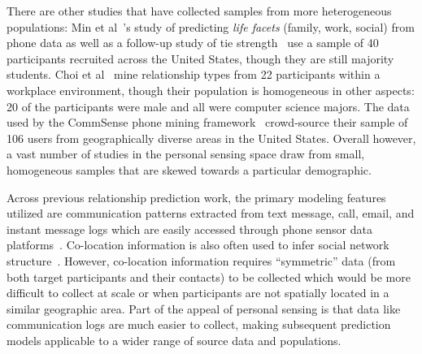 \documentclass[acmlarge]{acmart}
\begin{document}
There are other studies that have collected samples from more heterogeneous populations: Min et al~\cite{min2013mining}'s study of predicting \textit{life facets} (family, work, social) from phone data as well as a follow-up study of tie strength~\cite{wiese2015you} use a sample of 40 participants recruited across the United States, though they are still majority students. Choi et al~\cite{choi2013mining} mine relationship types from 22 participants within a workplace environment, though their population is homogeneous in other aspects: 20 of the participants were male and all were computer science majors. The data used by the CommSense phone mining framework~\cite{bao2015commsense} crowd-source their sample of 106 users from geographically diverse areas in the United States. Overall however, a vast number of studies in the personal sensing space draw from small, homogeneous samples that are skewed towards a particular demographic.

Across previous relationship prediction work, the primary modeling features utilized are communication patterns extracted from text message, call, email, and instant message logs which are easily accessed through phone sensor data platforms~\cite{mirisaee2010mining,dwarakanath2016analyzing}. Co-location information is also often used to infer social network structure~\cite{eagle2009inferring,yu2017semi,hsieh2014inferring,choi2013mining}. However, co-location information requires ``symmetric'' data (from both target participants and their contacts) to be collected which would be more difficult to collect at scale or when participants are not spatially located in a similar geographic area. Part of the appeal of personal sensing is that data like communication logs are much easier to collect, making subsequent prediction models applicable to a wider range of source data and populations.
\end{document}

